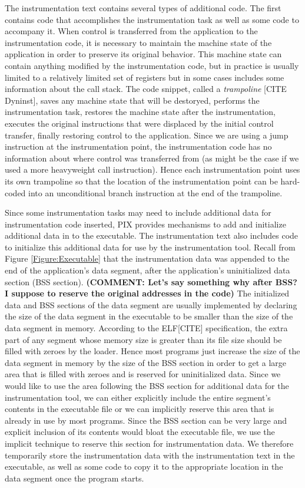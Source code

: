 The instrumentation text contains several types of additional code. The first
contains code that accomplishes the instrumentation task as well as some code to
accompany it. When control is transferred from the application to the
instrumentation code, it is necessary to maintain the machine state of
the application in order to preserve its original behavior. This machine state
can contain anything modified by the instrumentation code, but in practice is
usually limited to a relatively limited set of registers but in some cases includes
some information about the call stack. The code snippet, called a \textit{trampoline} [CITE Dyninst], 
saves any machine state that will be destoryed, performs the instrumentation task, restores
the machine state after the instrumentation, executes the
original instructions that were displaced by the initial control transfer,
finally restoring control to the application. Since we are using a jump instruction at the instrumentation point, the
instrumentation code has no information about where control was transferred from
(as might be the case if we used a more heavyweight call instruction). Hence
each instrumentation point uses its own trampoline so that the location of the
instrumentation point can be hard-coded into an unconditional branch instruction
at the end of the trampoline.

Since some instrumentation tasks may need to include additional data for instrumentation code inserted,
PIX provides mechanisms to add and initialize additional data in to the executable.
The instrumentation text also includes code to initialize this additional data for use by the
instrumentation tool. Recall from Figure \ref{Figure:Executable} that the instrumentation
data was appended to the end of the application's data segment, after the
application's uninitialized data section  (BSS section). \textbf{(COMMENT: Let's say something why after BSS? I suppose
to reserve the original addresses in the code)} The initialized data and BSS
sections of the data segment are usually implemented by declaring the size of
the data segment in the executable to be smaller than the size of the data
segment in memory. According to the ELF[CITE] specification, the extra part of any
segment whose memory size is greater than its file size should be filled with
zeroes by the loader. Hence most programs just increase the size of the data
segment in memory by the size of the BSS section in order to get a large
area that is filled with zeroes and is reserved for uninitialized data. Since we
would like to use the area following the BSS section for additional
data for the instrumentation tool, we can either explicitly include the entire
segment's contents in the executable file or we can implicitly reserve this area
that is already in use by most programs.
Since the BSS section can be very large and explicit inclusion of its contents
would bloat the  executable file, we use the implicit
technique to reserve this section for instrumentation data. We therefore
temporarily store the instrumentation data with the instrumentation text in the
executable, as well as some code to copy it to the appropriate location in the
data segment once the program starts.
